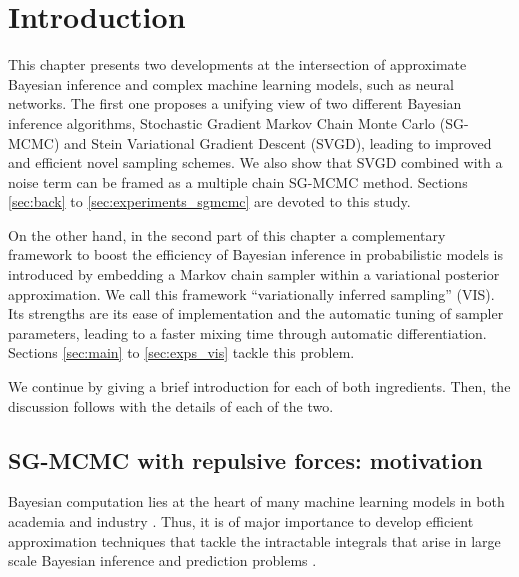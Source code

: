 \section{Introduction}

This chapter presents two developments at the intersection of approximate Bayesian inference and complex machine learning models, such as neural networks. The first one proposes a unifying view of two different Bayesian inference algorithms, Stochastic Gradient Markov Chain Monte Carlo (SG-MCMC) and Stein Variational Gradient Descent (SVGD), leading to improved and efficient novel sampling schemes. We also show that SVGD combined with a noise term can be framed as a multiple chain SG-MCMC method. Sections \ref{sec:back} to \ref{sec:experiments_sgmcmc} are devoted to this study.

On the other hand, in the second part of this chapter a complementary framework to boost the efficiency of Bayesian inference in probabilistic models is introduced by embedding a Markov chain sampler within a variational posterior approximation. We call this framework “variationally inferred sampling” (VIS). Its strengths are its ease of implementation and the automatic tuning of sampler parameters, leading to a faster mixing time through automatic differentiation.
Sections \ref{sec:main} to \ref{sec:exps_vis} tackle this problem.

We continue by giving a brief introduction for each of both ingredients. Then, the discussion follows with the details of each of the two. %




\subsection{SG-MCMC with repulsive forces: motivation }


Bayesian computation lies at the heart of many machine learning models in both academia and industry \cite{bishop2006pattern}. Thus, it is of major importance to develop efficient approximation techniques that tackle the intractable integrals that arise in large scale Bayesian inference and prediction problems \cite{gelman2013bayesian}. 

